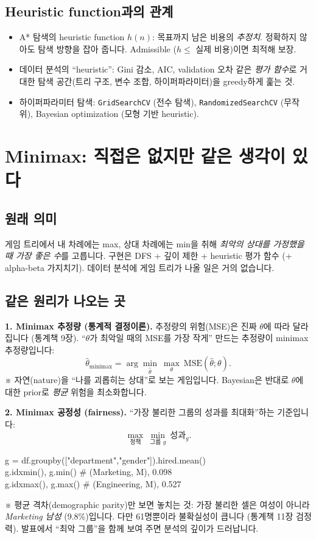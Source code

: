 \documentclass[11pt,a4paper]{article}
\newcommand{\code}[1]{\texttt{#1}}
\newcommand{\aside}[1]{{\footnotesize\color{black!65}#1}}
\begin{document}
\subsection{Heuristic function과의 관계}
\begin{itemize}
\item A* 탐색의 heuristic function $h(n)$: 목표까지 남은 비용의 \emph{추정치}. 정확하지 않아도 탐색 방향을 잡아 줍니다. Admissible ($h\le$ 실제 비용)이면 최적해 보장.
\item 데이터 분석의 ``heuristic'': Gini 감소, AIC, validation 오차 같은 \emph{평가 함수}로 거대한 탐색 공간(트리 구조, 변수 조합, 하이퍼파라미터)을 greedy하게 훑는 것.
\item 하이퍼파라미터 탐색: \code{GridSearchCV} (전수 탐색), \code{RandomizedSearchCV} (무작위), Bayesian optimization (모형 기반 heuristic).
\end{itemize}

\section{Minimax: 직접은 없지만 같은 생각이 있다}

\subsection{원래 의미}
게임 트리에서 내 차례에는 max, 상대 차례에는 min을 취해 \emph{최악의 상대를 가정했을 때 가장 좋은 수}를 고릅니다. 구현은 DFS + 깊이 제한 + heuristic 평가 함수 (+ alpha-beta 가지치기). 데이터 분석에 게임 트리가 나올 일은 거의 없습니다.

\subsection{같은 원리가 나오는 곳}
\textbf{1. Minimax 추정량 (통계적 결정이론).} 추정량의 위험(MSE)은 진짜 $\theta$에 따라 달라집니다 (통계책 9장). ``$\theta$가 최악일 때의 MSE를 가장 작게'' 만드는 추정량이 minimax 추정량입니다:
\[
\hat\theta_{\text{minimax}}=\arg\min_{\hat\theta}\ \max_{\theta}\ \text{MSE}(\hat\theta;\theta).
\]
\aside{※ 자연(nature)을 ``나를 괴롭히는 상대''로 보는 게임입니다. Bayesian은 반대로 $\theta$에 대한 prior로 \emph{평균} 위험을 최소화합니다.}

\textbf{2. Minimax 공정성 (fairness).} ``가장 불리한 그룹의 성과를 최대화''하는 기준입니다:
\[
\max_{\text{정책}}\ \min_{\text{그룹 }g}\ \text{성과}_g.
\]
\begin{codebox}
g = df.groupby(["department","gender"]).hired.mean()\\
g.idxmin(), g.min() \hfill \# (Marketing, M), 0.098\\
g.idxmax(), g.max() \hfill \# (Engineering, M), 0.527
\end{codebox}
\aside{※ 평균 격차(demographic parity)만 보면 놓치는 것: 가장 불리한 셀은 여성이 아니라 \emph{Marketing 남성} (9.8\%)입니다. 다만 61명뿐이라 불확실성이 큽니다 (통계책 11장 검정력). 발표에서 ``최악 그룹''을 함께 보여 주면 분석의 깊이가 드러납니다.}
\end{document}
